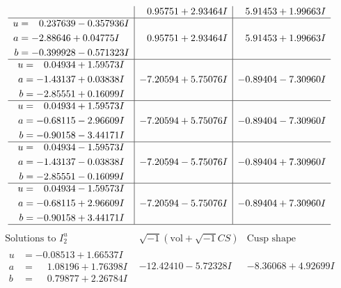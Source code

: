 \documentclass[1p]{elsarticle_modified}
\theoremstyle{definition}
\newcommand{\I}{\sqrt{-1}}
\begin{document}
$$\begin{array}{c|c|c}
 & \phantom{-}0.95751 + 2.93464 I & \phantom{-}5.91453 + 1.99663 I \\ \hline\begin{aligned}
u &= \phantom{-}0.237639 - 0.357936 I \\
a &= -2.88646 + 0.04775 I \\
b &= -0.399928 - 0.571323 I\end{aligned}
 & \phantom{-}0.95751 + 2.93464 I & \phantom{-}5.91453 + 1.99663 I \\ \hline\begin{aligned}
u &= \phantom{-}0.04934 + 1.59573 I \\
a &= -1.43137 + 0.03838 I \\
b &= -2.85551 + 0.16099 I\end{aligned}
 & -7.20594 + 5.75076 I & -0.89404 - 7.30960 I \\ \hline\begin{aligned}
u &= \phantom{-}0.04934 + 1.59573 I \\
a &= -0.68115 - 2.96609 I \\
b &= -0.90158 - 3.44171 I\end{aligned}
 & -7.20594 + 5.75076 I & -0.89404 - 7.30960 I \\ \hline\begin{aligned}
u &= \phantom{-}0.04934 - 1.59573 I \\
a &= -1.43137 - 0.03838 I \\
b &= -2.85551 - 0.16099 I\end{aligned}
 & -7.20594 - 5.75076 I & -0.89404 + 7.30960 I \\ \hline\begin{aligned}
u &= \phantom{-}0.04934 - 1.59573 I \\
a &= -0.68115 + 2.96609 I \\
b &= -0.90158 + 3.44171 I\end{aligned}
 & -7.20594 - 5.75076 I & -0.89404 + 7.30960 I\\
 \hline 
 \end{array}$$\newpage$$\begin{array}{c|c|c}  
\text{Solutions to }I^u_{2}& \I (\text{vol} + \sqrt{-1}CS) & \text{Cusp shape}\\
 \hline 
\begin{aligned}
u &= -0.08513 + 1.66537 I \\
a &= \phantom{-}1.08196 + 1.76398 I \\
b &= \phantom{-}0.79877 + 2.26784 I\end{aligned}
 & -12.42410 - 5.72328 I & -8.36068 + 4.92699 I \\ \hline\begin{aligned}

\end{aligned}
\end{array}$$
\end{document}
